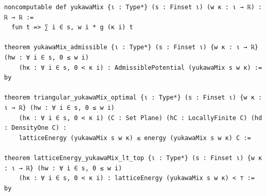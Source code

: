 \begin{Verbatim}[fontsize=\scriptsize,frame=single,framesep=1.5mm]
noncomputable def yukawaMix {ι : Type*} (s : Finset ι) (w κ : ι → ℝ) : ℝ → ℝ :=
  fun t => ∑ i ∈ s, w i * g (κ i) t

theorem yukawaMix_admissible {ι : Type*} (s : Finset ι) {w κ : ι → ℝ} (hw : ∀ i ∈ s, 0 ≤ w i)
    (hκ : ∀ i ∈ s, 0 < κ i) : AdmissiblePotential (yukawaMix s w κ) := by

theorem triangular_yukawaMix_optimal {ι : Type*} (s : Finset ι) {w κ : ι → ℝ} (hw : ∀ i ∈ s, 0 ≤ w i)
    (hκ : ∀ i ∈ s, 0 < κ i) (C : Set Plane) (hC : LocallyFinite C) (hd : DensityOne C) :
    latticeEnergy (yukawaMix s w κ) ≤ energy (yukawaMix s w κ) C :=

theorem latticeEnergy_yukawaMix_lt_top {ι : Type*} (s : Finset ι) {w κ : ι → ℝ} (hw : ∀ i ∈ s, 0 ≤ w i)
    (hκ : ∀ i ∈ s, 0 < κ i) : latticeEnergy (yukawaMix s w κ) < ⊤ := by
\end{Verbatim}

